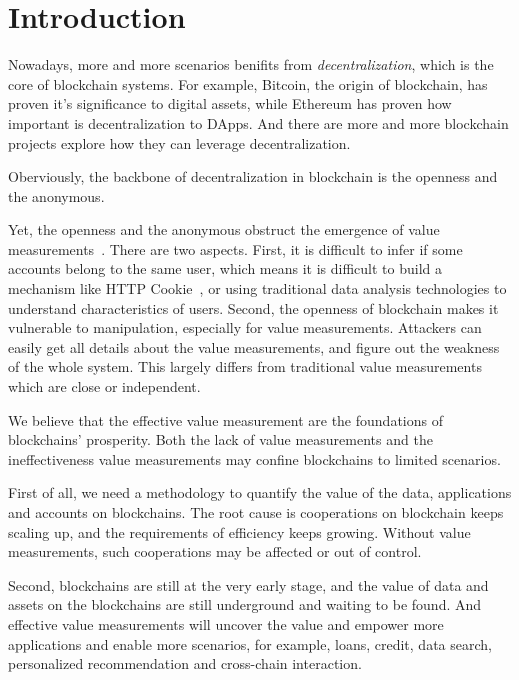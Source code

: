 \section{Introduction}

Nowadays, more and more scenarios benifits from \emph{decentralization}, which
is the core of blockchain systems. For example, Bitcoin, the origin of
blockchain, has proven it's significance to digital assets, while Ethereum has
proven how important is decentralization to DApps. And there are more and more
blockchain projects explore how they can leverage decentralization.

Oberviously, the backbone of decentralization in blockchain is the openness and the
anonymous.


Yet, the openness and the anonymous obstruct the emergence of value
measurements~\cite{meiklejohn2013fistful}. There are two aspects. First, it is
difficult to infer if some accounts belong to the same user, which means it is
difficult to build a mechanism like HTTP Cookie~\cite{Cookie}, or using
traditional data analysis technologies to understand characteristics of users.
Second, the openness of blockchain makes it vulnerable to manipulation,
especially for value measurements. Attackers can easily get all details about the
value measurements, and figure out the weakness of the whole system. This
largely differs from traditional value measurements which are close or
independent.

We believe that the effective value measurement are the foundations of
blockchains' prosperity. Both the lack of value measurements and the
ineffectiveness value measurements may confine blockchains to limited
scenarios.

First of all, we need a methodology to quantify the value of the data,
applications and accounts on blockchains. The root cause is cooperations on
blockchain keeps scaling up, and the requirements of efficiency
keeps growing. Without value measurements, such cooperations may be affected or
out of control.

Second, blockchains are still at the very early stage, and the value of data
and assets on the blockchains are still underground and waiting to be found.
And effective value measurements will uncover the value and empower more
applications and enable more scenarios, for example, loans, credit, data
search, personalized recommendation and cross-chain interaction.

